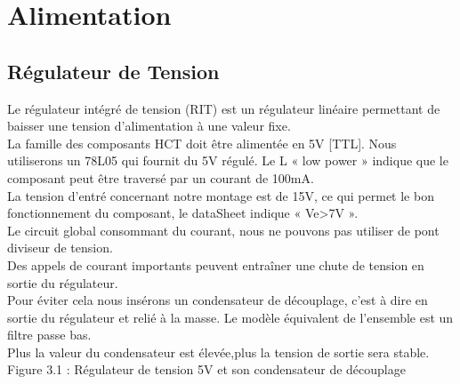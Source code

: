 \chapter{Alimentation}
\section{Régulateur de Tension }


Le régulateur intégré de tension (RIT) est un régulateur linéaire permettant de baisser une tension d’alimentation à une valeur fixe.\\

La famille des composants HCT doit être alimentée en 5V [TTL]. Nous utiliserons un 78L05 qui fournit du 5V régulé. Le L « low power » indique que le composant peut être traversé par un courant de 100mA.\\
La tension d’entré concernant notre montage est de 15V, ce qui permet le bon fonctionnement du composant, le dataSheet indique « Ve>7V ».  \\

Le circuit global consommant du courant, nous ne pouvons pas utiliser de pont diviseur de tension.\\
 
Des appels de courant importants peuvent entraîner une chute de tension en sortie du régulateur. \\
Pour éviter cela nous insérons un condensateur de découplage, c’est à dire  en sortie du régulateur et relié à la masse. 
Le modèle équivalent de l’ensemble est un filtre passe bas.\\

Plus la valeur du condensateur est élevée,plus la tension de sortie sera stable.\\


 Figure 3.1 : Régulateur de tension 5V et son condensateur de découplage
